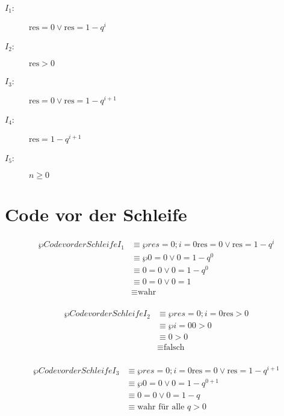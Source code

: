 \documentclass{lehramt-informatik-minimal}
\begin{document}

\begin{description}
\item[$I_1$:] $\text{res} = 0 \lor \text{res} = 1 - q^i$

\item[$I_2$:] $\text{res} > 0$

\item[$I_3$:] $\text{res} = 0 \lor \text{res} = 1 - q^{i+1}$

\item[$I_4$:] $\text{res} = 1 - q^{i+1}$

\item[$I_5$:] $n \geq 0$
\end{description}

\section{Code vor der Schleife}

\begin{align*}
\wp{Code vor der Schleife}{I_1}
& \equiv \wp{res = 0; i = 0}{\text{res} = 0 \lor \text{res} = 1 - q^i} \\
& \equiv \wp{}{0 = 0 \lor 0 = 1 - q^0} \\
& \equiv 0 = 0 \lor 0 = 1 - q^0 \\
& \equiv 0 = 0 \lor 0 = 1 \\
& \equiv \text{wahr} \\
\end{align*}

\begin{align*}
\wp{Code vor der Schleife}{I_2}
& \equiv \wp{res = 0; i = 0}{\text{res} > 0} \\
& \equiv \wp{i = 0}{0 > 0} \\
& \equiv 0 > 0 \\
& \equiv \text{falsch} \\
\end{align*}

\begin{align*}
\wp{Code vor der Schleife}{I_3}
& \equiv \wp{res = 0; i = 0}{\text{res} = 0 \lor \text{res} = 1 - q^{i+1}} \\
& \equiv \wp{}{0 = 0 \lor 0 = 1 - q^{0+1}} \\
& \equiv 0 = 0 \lor 0 = 1 - q \\
& \equiv \text{wahr für alle } q > 0\\
\end{align*}
\end{document}
